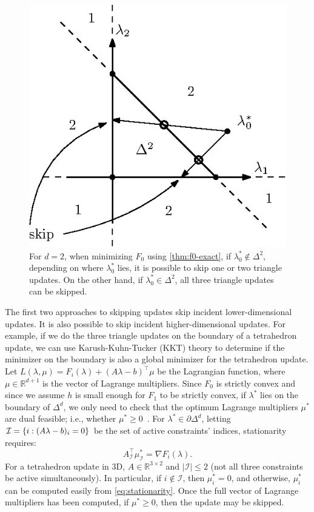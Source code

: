 \documentclass[eikonal.tex]{subfiles}
\begin{document}
\begin{figure}
  \centering
  \includegraphics{skip-zones.eps}
  \caption{For $d = 2$, when minimizing $F_0$ using
    \cref{thm:f0-exact}, if $\lambda^*_0 \notin \Delta^2$, depending
    on where $\lambda_0^*$ lies, it is possible to skip one or two
    triangle updates. On the other hand, if
    $\lambda_0^* \in \Delta^2$, all three triangle updates can be
    skipped.}\label{fig:skip-zones}
\end{figure}

The first two approaches to skipping updates skip incident
lower-dimensional updates. It is also possible to skip incident
higher-dimensional updates. For example, if we do the three triangle
updates on the boundary of a tetrahedron update, we can use
Karush-Kuhn-Tucker (KKT) theory to determine if the minimizer on the
boundary is also a global minimizer for the tetrahedron update. Let
$L(\lambda, \mu) = F_i(\lambda) + (A\lambda - b)^\top \mu$ be the
Lagrangian function, where $\mu \in \mathbb{R}^{d + 1}$ is the vector
of Lagrange multipliers. Since $F_0$ is strictly convex and since we
assume $h$ is small enough for $F_1$ to be strictly convex, if
$\lambda^*$ lies on the boundary of $\Delta^d$, we only need to check
that the optimum Lagrange multipliers $\mu^*$ are dual feasible; i.e.,
whether
$\mu^* \geq 0$~\cite{bertsekas1999nonlinear,nocedal2006numerical}. For
$\lambda^* \in \partial \Delta^d$, letting
$\mathcal{I} = \left\{i : (A\lambda - b)_i = 0\right\}$ be the set of active
constraints' indices, stationarity requires:
\begin{equation}\label{eq:stationarity}
  A^\top_{\mathcal{I}} \mu_{\mathcal{I}}^* = \nabla F_i(\lambda).
\end{equation}
For a tetrahedron update in 3D, $A \in \mathbb{R}^{3 \times 2}$ and
$|\mathcal{I}| \leq 2$ (not all three constraints be active
simultaneously). In particular, if $i \notin \mathcal{I}$, then
$\mu_i^* = 0$, and otherwise, $\mu_i^*$ can be computed easily from
\cref{eq:stationarity}. Once the full vector of Lagrange multipliers
has been computed, if $\mu^* \geq 0$, then the update may be skipped.
\end{document}
